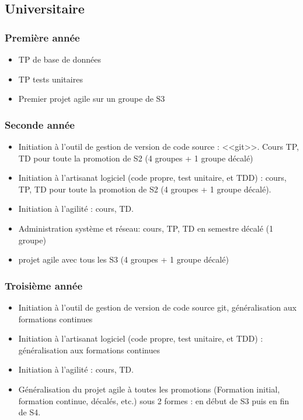 \documentclass[a4paper]{article}
\begin{document}
\subsection{Universitaire}

\subsubsection{Première année}
\begin{itemize}
  \item TP de base de données
  \item TP tests unitaires
  \item Premier projet agile sur un groupe de S3
\end{itemize}

\subsubsection{Seconde année}
\begin{itemize}
  \item Initiation à l'outil de gestion de version de code source : <<git>>. Cours TP, TD pour toute la promotion de S2 (4 groupes + 1 groupe décalé)
  \item Initiation à l'artisanat logiciel (code propre, test unitaire, et TDD) : cours, TP, TD pour toute la promotion de S2 (4 groupes + 1 groupe décalé).
  \item Initiation à l'agilité : cours, TD.
  \item Administration système et réseau: cours, TP, TD en semestre décalé (1 groupe)
  \item projet agile avec tous les S3 (4 groupes + 1 groupe décalé)
\end{itemize}

\subsubsection{Troisième année}
\begin{itemize}
  \item Initiation à l'outil de gestion de version de code source git, généralisation aux formations continues
  \item Initiation à l'artisanat logiciel (code propre, test unitaire, et TDD) : généralisation aux formations continues
  \item Initiation à l'agilité : cours, TD.
  \item Généralisation du projet agile à toutes les promotions (Formation initial, formation continue, décalés, etc.) sous 2 formes : en début de S3 puis en fin de S4.
\end{itemize}
\end{document}
